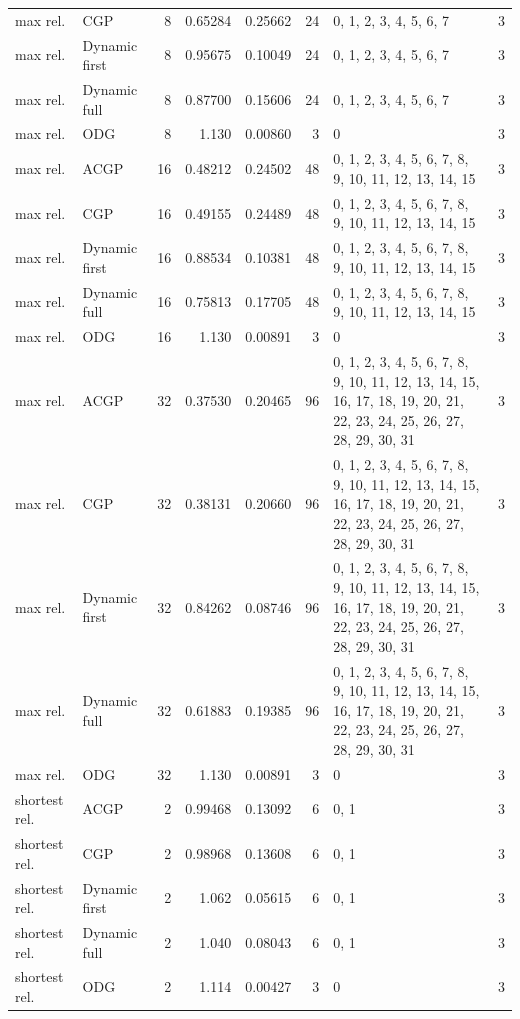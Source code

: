 \documentclass[10pt,a4paper]{article}
\begin{document}
\begin{longtable}{@{}p{23mm}p{29mm}rrrrp{36mm}r@{}}
max rel. & CGP & 8 & 0.65284 & 0.25662 & 24 & 0, 1, 2, 3, 4, 5, 6, 7 & 3 \\
max rel. & Dynamic first & 8 & 0.95675 & 0.10049 & 24 & 0, 1, 2, 3, 4, 5, 6, 7 & 3 \\
max rel. & Dynamic full & 8 & 0.87700 & 0.15606 & 24 & 0, 1, 2, 3, 4, 5, 6, 7 & 3 \\
max rel. & ODG & 8 & 1.130 & 0.00860 & 3 & 0 & 3 \\
max rel. & ACGP & 16 & 0.48212 & 0.24502 & 48 & 0, 1, 2, 3, 4, 5, 6, 7, 8, 9, 10, 11, 12, 13, 14, 15 & 3 \\
max rel. & CGP & 16 & 0.49155 & 0.24489 & 48 & 0, 1, 2, 3, 4, 5, 6, 7, 8, 9, 10, 11, 12, 13, 14, 15 & 3 \\
max rel. & Dynamic first & 16 & 0.88534 & 0.10381 & 48 & 0, 1, 2, 3, 4, 5, 6, 7, 8, 9, 10, 11, 12, 13, 14, 15 & 3 \\
max rel. & Dynamic full & 16 & 0.75813 & 0.17705 & 48 & 0, 1, 2, 3, 4, 5, 6, 7, 8, 9, 10, 11, 12, 13, 14, 15 & 3 \\
max rel. & ODG & 16 & 1.130 & 0.00891 & 3 & 0 & 3 \\
max rel. & ACGP & 32 & 0.37530 & 0.20465 & 96 & 0, 1, 2, 3, 4, 5, 6, 7, 8, 9, 10, 11, 12, 13, 14, 15, 16, 17, 18, 19, 20, 21, 22, 23, 24, 25, 26, 27, 28, 29, 30, 31 & 3 \\
max rel. & CGP & 32 & 0.38131 & 0.20660 & 96 & 0, 1, 2, 3, 4, 5, 6, 7, 8, 9, 10, 11, 12, 13, 14, 15, 16, 17, 18, 19, 20, 21, 22, 23, 24, 25, 26, 27, 28, 29, 30, 31 & 3 \\
max rel. & Dynamic first & 32 & 0.84262 & 0.08746 & 96 & 0, 1, 2, 3, 4, 5, 6, 7, 8, 9, 10, 11, 12, 13, 14, 15, 16, 17, 18, 19, 20, 21, 22, 23, 24, 25, 26, 27, 28, 29, 30, 31 & 3 \\
max rel. & Dynamic full & 32 & 0.61883 & 0.19385 & 96 & 0, 1, 2, 3, 4, 5, 6, 7, 8, 9, 10, 11, 12, 13, 14, 15, 16, 17, 18, 19, 20, 21, 22, 23, 24, 25, 26, 27, 28, 29, 30, 31 & 3 \\
max rel. & ODG & 32 & 1.130 & 0.00891 & 3 & 0 & 3 \\
shortest rel. & ACGP & 2 & 0.99468 & 0.13092 & 6 & 0, 1 & 3 \\
shortest rel. & CGP & 2 & 0.98968 & 0.13608 & 6 & 0, 1 & 3 \\
shortest rel. & Dynamic first & 2 & 1.062 & 0.05615 & 6 & 0, 1 & 3 \\
shortest rel. & Dynamic full & 2 & 1.040 & 0.08043 & 6 & 0, 1 & 3 \\
shortest rel. & ODG & 2 & 1.114 & 0.00427 & 3 & 0 & 3 \\

\end{longtable}
\end{document}
